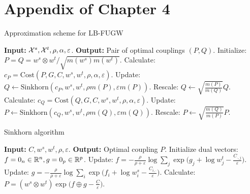 \section{Appendix of Chapter 4}

\begin{algorithm}[t]
  \caption{Approximation scheme for LB-FUGW}
  \label{alg:lbfugw}
  \begin{algorithmic}[1]
      \STATE \textbf{Input:} $\mathcal X^s, \mathcal X^t, \rho, \alpha, \varepsilon$.
      \STATE \textbf{Output:} Pair of optimal couplings $(P, Q)$.
      \STATE Initialize: $P = Q = w^s \otimes w^t / \sqrt{m(w^s) m(w^t)}$.
          \STATE Calculate: $c_P = \text{Cost}(P,  G, C, w^s, w^t, \rho, \alpha, \varepsilon)$.
          \STATE Update: $Q \gets \text{Sinkhorn}(c_P, w^s, w^t, \rho m(P), \varepsilon m(P))$.
          \STATE Rescale: $Q \gets \sqrt{\frac{m(P)}{m(Q)}} Q$.
          \STATE Calculate: $c_Q = \text{Cost}(Q,  G, C, w^s, w^t, \rho, \alpha, \varepsilon)$.
          \STATE Update: $P \gets \text{Sinkhorn}(c_Q, w^s, w^t, \rho m(Q), \varepsilon m(Q))$.
          \STATE Rescale: $P \gets \sqrt{\frac{m(Q)}{m(P)}} P$.
      \ENDWHILE
  \end{algorithmic}
\end{algorithm}

\begin{algorithm}[t]
  \caption{Sinkhorn algorithm \citep{Sejourne19}}
  \label{alg:sinkhorn}
  \begin{algorithmic}[1]
      \STATE \textbf{Input:} $C, w^s, w^t, \rho, \varepsilon$.
      \STATE \textbf{Output:} Optimal coupling $P$.
      \STATE Initialize dual vectors: $f = 0_n \in \mathbb R^n, g = 0_p \in \mathbb R^p$.
          \STATE Update: $f = -\frac{\rho}{\rho + \varepsilon} \log \sum_j \exp \big( g_j + \log w^t_j - \frac{C_{\cdot,j}}{\varepsilon} \big)$.
        \STATE Update: $g = -\frac{\rho}{\rho + \varepsilon} \log \sum_i \exp \big( f_i + \log w^s_i - \frac{C_{i,\cdot}}{\varepsilon} \big)$.
      \ENDWHILE
      \STATE Calculate: $P = (w^s \otimes w^t) \exp \big(f \oplus g - \frac{C}{\varepsilon} \big)$.
  \end{algorithmic}
\end{algorithm}

